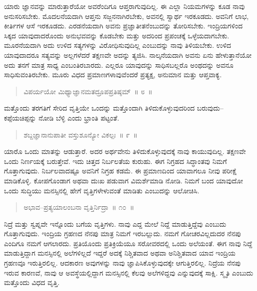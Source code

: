 ಯಾರು ಜ್ಞಾನವನ್ನು ಮಾರುತ್ತಾರೆಯೋ ಅವರೆಂದಿಗೂ ಆಪ್ತರಾಗುವುದಿಲ್ಲ. ಈ ಎಲ್ಲಾ ನಿಯಮಗಳನ್ನು ಕೂಡ ನಾವು ಅನುಸರಿಸಬೇಕು. ಮೊದಲನೆಯದಾಗಿ ಆಪ್ತನು ಸಜ್ಜನನಾಗಿರಬೇಕು, ಅವನಲ್ಲಿ ಸ್ವಾರ್ಥ ಇರಕೂಡದು. ಅವನಿಗೆ ಲಾಭ, ಕೀರ್ತಿಗಳ ಆಸೆ ಇರಕೂಡದು. ಎರಡನೆಯದಾಗಿ ಅವನು ಪ್ರಜ್ಞಾತೀತನೆಂಬುದನ್ನು ತೋರಿಸಬೇಕು. ಇಂದ್ರಿಯಗಳಿಂದ ಸಿಕ್ಕದ ಯಾವುದಾದರೊಂದು ಅನುಭವವನ್ನು ಕೊಡಬೇಕು ಮತ್ತು ಅದರಿಂದ ಪ್ರಪಂಚಕ್ಕೆ ಒಳ್ಳೆಯದಾಗಬೇಕು. ಮೂರನೆಯದಾಗಿ ಅದು ಉಳಿದ ಸತ್ಯಗಳನ್ನು ವಿರೋಧಿಸುವುದಿಲ್ಲ ಎಂಬುದನ್ನು ನಾವು ತಿಳಿಯಬೇಕು. ಉಳಿದ ಯಾವುದಾದರೂ ಸತ್ಯವನ್ನು ಅಲ್ಲಗಳೆದರೆ ತಕ್ಷಣವೇ ಅದನ್ನು ತ್ಯಜಿಸಿ. ನಾಲ್ಕನೆಯದಾಗಿ ಅವನು ಏನು ಹೇಳುತ್ತಾನೆಯೋ ಅದು ತನಗೆ ಮಾತ್ರ ಸಾಧ್ಯ ಎಂಬಂತಿರಬಾರದು. ಎಲ್ಲರೂ ಯಾವುದನ್ನು ಸಾಧಿಸಬಲ್ಲರೊ ಅಂಥದನ್ನು ಅವನೂ ಸಾಧಿಸುವಂತಿರಬೇಕು. ಮೂರು ವಿಧದ ಪ್ರಮಾಣಗಳಾವುವೆಂದರೆ ಪ್ರತ್ಯಕ್ಷ, ಅನುಮಾನ ಮತ್ತು ಆಪ್ತವಾಕ್ಯ.

\begin{verse}
ವಿಪರ್ಯಯೋ ಮಿಥ್ಯಾಜ್ಞಾನಮತದ್ರೂಪಪ್ರತಿಷ್ಠಮ್​~॥ ೮~॥
\end{verse}


ಮತ್ತೊಂದು ತರಗತಿಗೆ ಸೇರಿದ ವೃತ್ತಿಯೇ ಒಂದನ್ನು ಮತ್ತೊಂದಾಗಿ ತಿಳಿದುಕೊಳ್ಳುವುದರಿಂದ ಬರುವುದು–ಕಪ್ಪೆಯಚಿಪ್ಪನ್ನು ನೋಡಿ ಬೆಳ್ಳಿ ಎಂದು ಭ್ರಾಂತಿ ಪಟ್ಟಂತೆ.

\begin{verse}
ಶಬ್ದಜ್ಞಾನಾನುಪಾತೀ ವಸ್ತುಶೂನ್ಯೋ ವಿಕಲ್ಪಃ~॥ ೯~॥
\end{verse}



ಯಾರೊ ಒಂದು ಮಾತನ್ನು ಆಡುತ್ತಾರೆ. ಅದರ ಅರ್ಥವೇನು ತಿಳಿದುಕೊಳ್ಳುವುದಕ್ಕೆ ನಾವು ಕಾಯುವುದಿಲ್ಲ. ತಕ್ಷಣವೇ ಒಂದು ನಿರ್ಣಯಕ್ಕೆ ಬರುತ್ತೇವೆ. ಇದು ಚಿತ್ತದ ನಿರ್ಬಲತೆಯ ಕುರುಹು. ಈಗ ನಿಗ್ರಹದ ಸಿದ್ಧಾಂತವು ನಿಮಗೆ ಗೊತ್ತಾಗುವುದು. ನಿರ್ಬಲವಾದಷ್ಟೂ ಅವನಿಗೆ ನಿಗ್ರಹ ಕಡಮೆ. ಈ ಪ್ರಮಾಣದಿಂದ ಯಾವಾಗಲೂ ನೀವು ಪರೀಕ್ಷೆ ಮಾಡಿಕೊಳ್ಳಿ. ಕೋಪಗೊಂಡಾಗ ಅಥವಾ ದುಃಖ ಪಡುವಾಗ ವಿಮರ್ಶೆಮಾಡಿ ನೋಡಿ. ನಿಮಗೆ ಬಂದ ಯಾವುದೋ ಒಂದು ಸುದ್ಧಿಯು ಮನಸ್ಸಿನಲ್ಲಿ ಹೇಗೆ ವೃತ್ತಿಗಳೇಳುವಂತೆ ಮಾಡಿತು ಎಂಬುದನ್ನು ಆಲೋಚಿಸಿ.

\begin{verse}
ಅಭಾವ–ಪ್ರತ್ಯಯಾಲಂಬನಾ ವೃತ್ತಿರ್ನಿದ್ರಾ~॥ ೧೦~॥
\end{verse}

\vspace{-0.2cm}


ನಿದ್ರೆ ಮತ್ತು ಸ್ವಪ್ನವೇ ಇನ್ನೊಂದು ಬಗೆಯ ವೃತ್ತಿಗಳು. ನಾವು ಎದ್ದ ಮೇಲೆ ನಿದ್ದೆ ಮಾಡುತ್ತಿದ್ದೆವು ಎಂಬುದು ಗೊತ್ತಾಗುವುದು. ಇಂದ್ರಿಯ ಗ್ರಹಣದ ನೆನಪು ಮಾತ್ರ ನಿಮಗೆ ಇರಬಲ್ಲುದು. ನಮಗೆ ಗೋಚರವಿಲ್ಲದುದರ ನೆನಪು ಎಂದಿಗೂ ನಮಗೆ ಆಗಲಾರದು. ಪ್ರತಿಯೊಂದು ಪ್ರತಿಕ್ರಿಯೆಯೂ ಸರೋವರದಲ್ಲಿ ಒಂದು ಅಲೆಯಂತೆ. ಈಗ ನಾವು ನಿದ್ದೆ ಮಾಡುತ್ತಿದ್ದಾಗ ಮನಸ್ಸಿನಲ್ಲಿ ಅಲೆಗಳಿಲ್ಲದೆ ಇದ್ದರೆ ಅದಕ್ಕೆ ನಿಶ್ಚಿತವಾದ ಅಥವಾ ಅನಿಶ್ಚಿತವಾದ ಯಾವ ಇಂದ್ರಿಯ ಗ್ರಹಣವೂ ಇರುತ್ತಿರಲಿಲ್ಲ. ಆದಕಾರಣ ಅವುಗಳನ್ನು ನಾವು ಜ್ಞಾಪಿಸಿಕೊಳ್ಳುವುದಕ್ಕೇ ಆಗುತ್ತಿರಲಿಲ್ಲ. ನಿದ್ರೆಯ ನೆನಪು ಇರುವ ಕಾರಣವೆ, ನಾವು ಆ ಅವಸ್ಥೆಯಲ್ಲಿದ್ದಾಗ ಮನಸ್ಸಿನಲ್ಲಿ ಕೆಲವು ಅಲೆಗಳಿದ್ದವು ಎನ್ನುವುದಕ್ಕೆ ಸಾಕ್ಷಿ. ಸ್ಮೃತಿ ಎಂಬುದು ಮತ್ತೊಂದು ವಿಧದ ವೃತ್ತಿ. 

